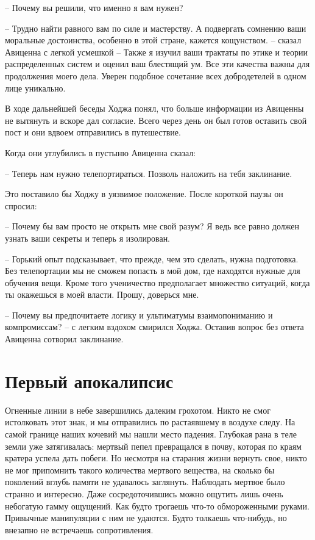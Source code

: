 \documentclass[12pt,a4paper]{article}
\begin{document}
-- Почему вы решили, что именно я вам нужен?

-- Трудно найти равного вам по силе и мастерству. А подвергать сомнению ваши моральные достоинства, особенно в этой стране, кажется кощунством. -- сказал Авиценна с легкой усмешкой -- Также я изучил ваши трактаты по этике и теории распределенных систем и оценил ваш блестящий ум. Все эти качества важны для продолжения моего дела. Уверен подобное сочетание всех добродетелей в одном лице уникально.

В ходе дальнейшей беседы Ходжа понял, что больше информации из Авиценны не вытянуть и вскоре дал согласие. Всего через день он был готов оставить свой пост и они вдвоем отправились в путешествие.

Когда они углубились в пустыню Авиценна сказал:

-- Теперь нам нужно телепортираться. Позволь наложить на тебя заклинание.

Это поставило бы Ходжу в уязвимое положение. После короткой паузы он спросил:

-- Почему бы вам просто не открыть мне свой разум? Я ведь все равно должен узнать ваши секреты и теперь я изолирован.

-- Горький опыт подсказывает, что прежде, чем это сделать, нужна подготовка. Без телепортации мы не сможем попасть в мой дом, где находятся нужные для обучения вещи. Кроме того ученичество предполагает множество ситуаций, когда ты окажешься в моей власти. Прошу, доверься мне.

-- Почему вы предпочитаете логику и ультиматумы взаимопониманию и компромиссам? -- с легким вздохом смирился Ходжа.
Оставив вопрос без ответа Авиценна сотворил заклинание.



\section*{Первый апокалипсис}

Огненные линии в небе завершились далеким грохотом. Никто не смог истолковать этот знак, и мы отправились по растаявшему в воздухе следу. На самой границе наших кочевий мы нашли место падения. Глубокая рана в теле земли уже затягивалась: мертвый пепел превращался в почву, которая по краям кратера успела дать побеги. Но несмотря на старания жизни вернуть свое, никто не мог припомнить такого количества мертвого вещества, на сколько бы поколений вглубь памяти не удавалось заглянуть. Наблюдать мертвое было странно и интересно. Даже сосредоточившись можно ощутить лишь очень небогатую гамму ощущений. Как будто трогаешь что-то обмороженными руками. Привычные манипуляции с ним не удаются. Будто толкаешь что-нибудь, но внезапно не встречаешь сопротивления.
\end{document}
